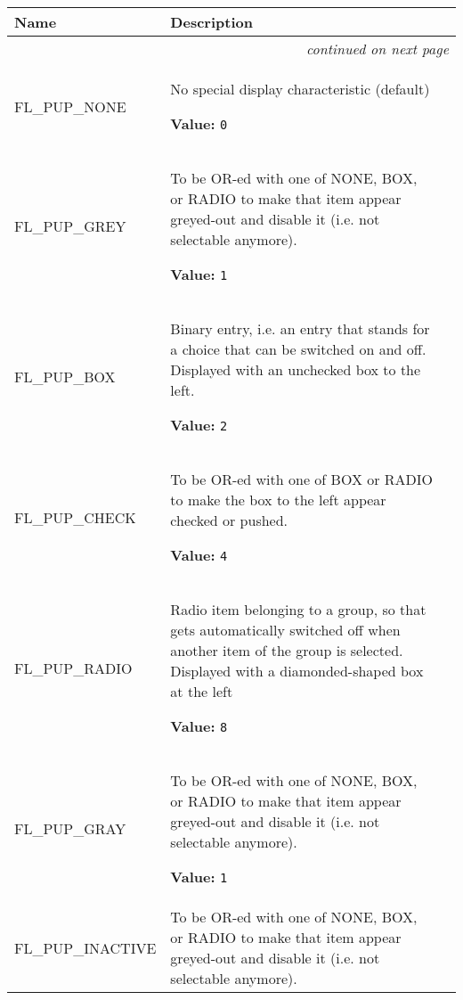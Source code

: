     \vspace{-1cm}
\hspace{\varindent}\begin{longtable}{|p{\varnamewidth}|p{\vardescrwidth}|l}
\cline{1-2}
\cline{1-2} \centering \textbf{Name} & \centering \textbf{Description}& \\
\cline{1-2}
\endhead\cline{1-2}\multicolumn{3}{r}{\small\textit{continued on next page}}\\\endfoot\cline{1-2}
\endlastfoot\raggedright F\-L\-\_\-P\-U\-P\-\_\-N\-O\-N\-E\- & \raggedright No special display characteristic (default)

\textbf{Value:} 
{\tt 0}&\\
\cline{1-2}
\raggedright F\-L\-\_\-P\-U\-P\-\_\-G\-R\-E\-Y\- & \raggedright To be OR-ed with one of NONE, BOX, or RADIO to make that item 
          appear greyed-out and disable it (i.e. not selectable anymore).

\textbf{Value:} 
{\tt 1}&\\
\cline{1-2}
\raggedright F\-L\-\_\-P\-U\-P\-\_\-B\-O\-X\- & \raggedright Binary entry, i.e. an entry that stands for a choice that can be 
          switched on and off. Displayed with an unchecked box to the left.

\textbf{Value:} 
{\tt 2}&\\
\cline{1-2}
\raggedright F\-L\-\_\-P\-U\-P\-\_\-C\-H\-E\-C\-K\- & \raggedright To be OR-ed with one of BOX or RADIO to make the box to the left 
          appear checked or pushed.

\textbf{Value:} 
{\tt 4}&\\
\cline{1-2}
\raggedright F\-L\-\_\-P\-U\-P\-\_\-R\-A\-D\-I\-O\- & \raggedright Radio item belonging to a group, so that gets automatically 
          switched off when another item of the group is selected. 
          Displayed with a diamonded-shaped box at the left

\textbf{Value:} 
{\tt 8}&\\
\cline{1-2}
\raggedright F\-L\-\_\-P\-U\-P\-\_\-G\-R\-A\-Y\- & \raggedright To be OR-ed with one of NONE, BOX, or RADIO to make that item 
          appear greyed-out and disable it (i.e. not selectable anymore).

\textbf{Value:} 
{\tt 1}&\\
\cline{1-2}
\raggedright F\-L\-\_\-P\-U\-P\-\_\-I\-N\-A\-C\-T\-I\-V\-E\- & \raggedright To be OR-ed with one of NONE, BOX, or RADIO to make that item 
          appear greyed-out and disable it (i.e. not selectable anymore).


\end{longtable}

